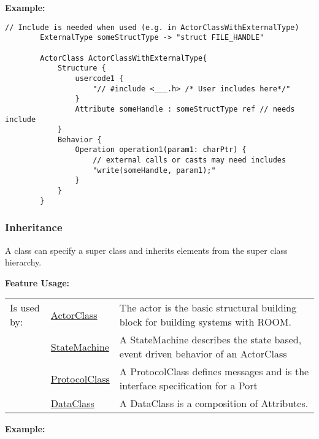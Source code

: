 		
	\textbf{Example:}
	
		\begin{lstlisting}[language=ROOM]
		// Include is needed when used (e.g. in ActorClassWithExternalType)
		ExternalType someStructType -> "struct FILE_HANDLE"
		
		ActorClass ActorClassWithExternalType{
			Structure {
				usercode1 {
					"// #include <___.h> /* User includes here*/"
				}
				Attribute someHandle : someStructType ref // needs include
			}
			Behavior {
				Operation operation1(param1: charPtr) {
					// external calls or casts may need includes
					"write(someHandle, param1);"
				}
			}
		}
		\end{lstlisting}
	
	\vspace{\baselineskip}
	\vspace{\baselineskip}
	\vspace{\baselineskip}
	
\subsubsection{Inheritance}
	\hypertarget{ref:Inheritance}{}
	A class can specify a super class and inherits elements from the super class hierarchy.
		
	
		
		
		
	\begingroup
	\textbf{Feature Usage:}
	\renewcommand{\arraystretch}{1.8} %
	\begin{longtable}{l|l p{}}
		\hline
	Is used by: & \tabitem \hyperlink{ref:ActorClass}{ActorClass}  & The actor is the basic structural building block for building systems with ROOM.\\
	& \tabitem \hyperlink{ref:StateMachine}{StateMachine}  & A StateMachine describes the state based, event driven behavior of an ActorClass \\
	& \tabitem \hyperlink{ref:ProtocolClass}{ProtocolClass}  & A ProtocolClass defines messages and is the interface specification for a Port \\
	& \tabitem \hyperlink{ref:DataClass}{DataClass}  & A DataClass is a composition of Attributes. \\
	\hline
	\end{longtable}
	\endgroup
		
	\textbf{Example:}
	
